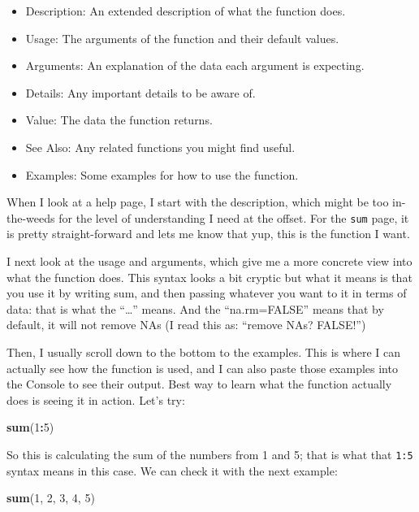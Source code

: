 \documentclass[]{book}
\newenvironment{Shaded}{\begin{snugshade}}{\end{snugshade}}
\newcommand{\DecValTok}[1]{\textcolor[rgb]{0.00,0.00,0.81}{#1}}
\newcommand{\KeywordTok}[1]{\textcolor[rgb]{0.13,0.29,0.53}{\textbf{#1}}}
\newcommand{\NormalTok}[1]{#1}
\newcommand{\OperatorTok}[1]{\textcolor[rgb]{0.81,0.36,0.00}{\textbf{#1}}}
\providecommand{\tightlist}{%
  \setlength{\itemsep}{0pt}\setlength{\parskip}{0pt}}
\begin{document}
\begin{itemize}
\tightlist
\item
  Description: An extended description of what the function does.
\item
  Usage: The arguments of the function and their default values.
\item
  Arguments: An explanation of the data each argument is expecting.
\item
  Details: Any important details to be aware of.
\item
  Value: The data the function returns.
\item
  See Also: Any related functions you might find useful.
\item
  Examples: Some examples for how to use the function.
\end{itemize}

When I look at a help page, I start with the description, which might be too in-the-weeds for the level of understanding I need at the offset. For the \texttt{sum} page, it is pretty straight-forward and lets me know that yup, this is the function I want.

I next look at the usage and arguments, which give me a more concrete view into what the function does. This syntax looks a bit cryptic but what it means is that you use it by writing sum, and then passing whatever you want to it in terms of data: that is what the ``\ldots{}'' means. And the ``na.rm=FALSE'' means that by default, it will not remove NAs (I read this as: ``remove NAs? FALSE!'')

Then, I usually scroll down to the bottom to the examples. This is where I can actually see how the function is used, and I can also paste those examples into the Console to see their output. Best way to learn what the function actually does is seeing it in action. Let's try:

\begin{Shaded}
\begin{Highlighting}[]
\KeywordTok{sum}\NormalTok{(}\DecValTok{1}\OperatorTok{:}\DecValTok{5}\NormalTok{)}
\end{Highlighting}
\end{Shaded}

So this is calculating the sum of the numbers from 1 and 5; that is what that \texttt{1:5} syntax means in this case. We can check it with the next example:

\begin{Shaded}
\begin{Highlighting}[]
\KeywordTok{sum}\NormalTok{(}\DecValTok{1}\NormalTok{, }\DecValTok{2}\NormalTok{, }\DecValTok{3}\NormalTok{, }\DecValTok{4}\NormalTok{, }\DecValTok{5}\NormalTok{)}
\end{Highlighting}
\end{Shaded}
\end{document}
